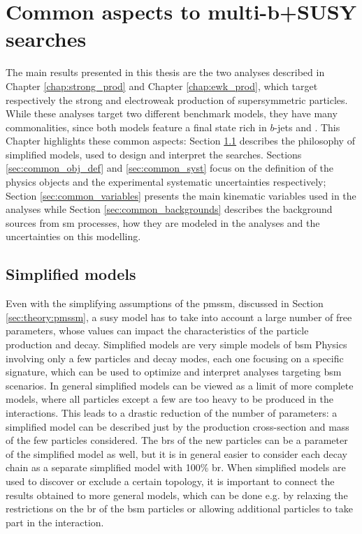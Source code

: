 \chapter{Common aspects to multi-b+\met SUSY searches}
\label{chap:multib_general}

The main results presented in this thesis are the two analyses described in Chapter \ref{chap:strong_prod} and Chapter \ref{chap:ewk_prod}, which target respectively the strong and electroweak production of supersymmetric particles.
While these analyses target two different benchmark models, they have many commonalities, since both models feature 
a final state rich in $b$-jets and \met. This Chapter highlights these common aspects: 
Section \ref{sec:simplified_models} describes the philosophy of simplified models, used to design and interpret the searches. 
Sections \ref{sec:common_obj_def} and \ref{sec:common_syst} focus on the definition of the physics objects and the experimental systematic uncertainties respectively; Section \ref{sec:common_variables} presents the main kinematic variables used in the analyses 
while Section \ref{sec:common_backgrounds} describes the background sources from \gls{sm} processes, 
how they are modeled in the analyses and the uncertainties on this modelling. 

\section{Simplified models}
\label{sec:simplified_models}

Even with the simplifying assumptions of the \gls{pmssm}, discussed in Section \ref{sec:theory:pmssm}, a \gls{susy} model has to take into account a large number of free parameters, whose values can impact the characteristics of the particle production and decay. 
Simplified models \cite{Alves:2011wf} are very simple models of \gls{bsm} Physics involving only a few particles and decay modes, 
each one focusing on a specific signature, which can be used to optimize and interpret analyses targeting \gls{bsm} scenarios. 
In general simplified models can be viewed as a limit of more complete models, where all particles except a few are too heavy to be 
produced in the interactions. This leads to a drastic reduction of the number of parameters: a simplified model can be described just by the production cross-section and mass of the few particles considered. 
The \glspl{br} of the new particles can be a parameter of the simplified model as well, but it is in general easier to consider each decay chain as a separate simplified model with 100\% \gls{br}.
When simplified models are used to discover or exclude a certain topology, it is important to connect the results obtained to more general models, 
which can be done e.g. by relaxing the restrictions on the \gls{br} of the \gls{bsm} particles or allowing additional particles to take part in the interaction.

